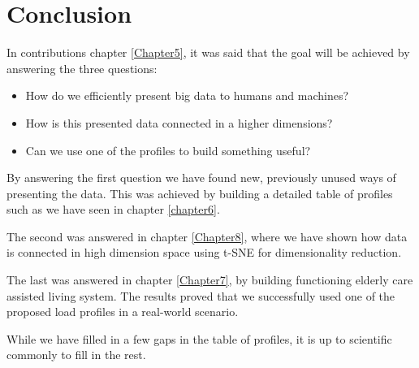 
\chapter{Conclusion} %

\label{Chapter9} %

In contributions chapter \ref{Chapter5}, it was said that the goal will be achieved by answering the three questions:

\begin{itemize}
	\item How do we efficiently present big data to humans and machines?
	\item How is this presented data connected in a higher dimensions?
	\item Can we use one of the profiles to build something useful? 
\end{itemize}

By answering the first question we have found new, previously unused ways of presenting the data.
This was achieved by building a detailed table of profiles such as we have seen in chapter \ref{chapter6}.

The second was answered in chapter \ref{Chapter8}, where we have shown how data is connected in high dimension space
using t-SNE for dimensionality reduction. 

The last was answered in chapter \ref{Chapter7}, by building functioning elderly care assisted living system. 
The results proved that we successfully used one of the proposed load profiles in a real-world scenario. 

While we have filled in a few gaps in the table of profiles, it is up to scientific commonly to fill in the rest. 